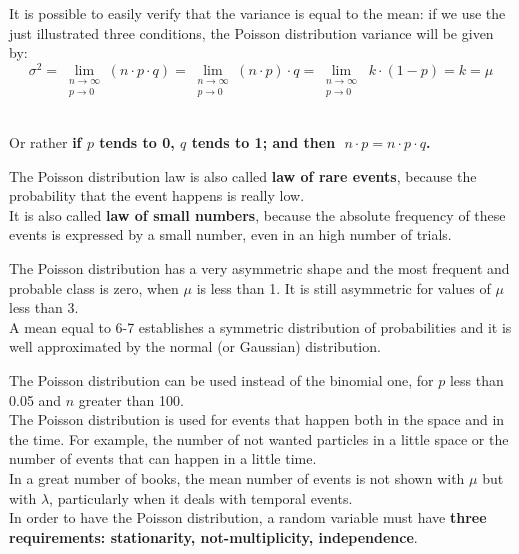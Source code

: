 \begin{frame}
  \vspace*{.25cm}
  It is possible to easily verify that the variance is equal to the mean: if we use the just illustrated three conditions, the Poisson distribution variance will be given by:
  \vspace*{.25cm}
  $$ \sigma^2 = \lim_{\substack{n \rightarrow \infty \\ p \rightarrow 0}}{(n \cdot p \cdot q)} = \lim_{\substack{n \rightarrow \infty \\ p \rightarrow 0}}{(n \cdot p) \cdot q} = \lim_{\substack{n \rightarrow \infty \\ p \rightarrow 0}}{\; k \cdot (1- p)} = k = \mu $$\\
  \begin{center}
    Or rather \textbf{if {\boldmath $ p $} tends to 0, {\boldmath $ q $} tends to 1; and then {\boldmath $ \;n \cdot p = n \cdot p \cdot q $}.}
  \end{center}
  \vspace*{.35cm}
  The Poisson distribution law is also called \textbf{law of rare events}, because the probability that the event happens is really low.\\
  \vspace*{.25cm}
  It is also called \textbf{law of small numbers}, because the absolute frequency of these events is expressed by a small number, even in an high number of trials.
\end{frame}

\begin{frame}
  \vspace*{.5cm}
  The Poisson distribution has a very asymmetric shape and the most frequent and probable class is zero, when $ \mu $ is less than 1. It is still asymmetric for values of $ \mu $ less than 3.\\
  \vspace*{.5cm}
  A mean equal to 6-7 establishes a symmetric distribution of probabilities and it is well approximated by the normal (or Gaussian) distribution.
\end{frame}

\begin{frame}
  \vspace*{.25cm}
  The Poisson distribution can be used instead of the binomial one, for $ p $ less than 0.05 and $ n $ greater than 100.\\
  \vspace*{.5cm}
  The Poisson distribution is used for events that happen both in the space and in the time. For example, the number of not wanted particles in a little space or the number of events that can happen in a little time.\\
  \vspace*{.5cm}
  In a great number of books, the mean number of events is not shown with $ \mu $ but with {\boldmath $ \lambda $}, particularly when it deals with temporal events.\\
  \vspace*{.5cm}
  In order to have the Poisson distribution, a random variable must have \textbf{three requirements: stationarity, not-multiplicity, independence}.
\end{frame}


